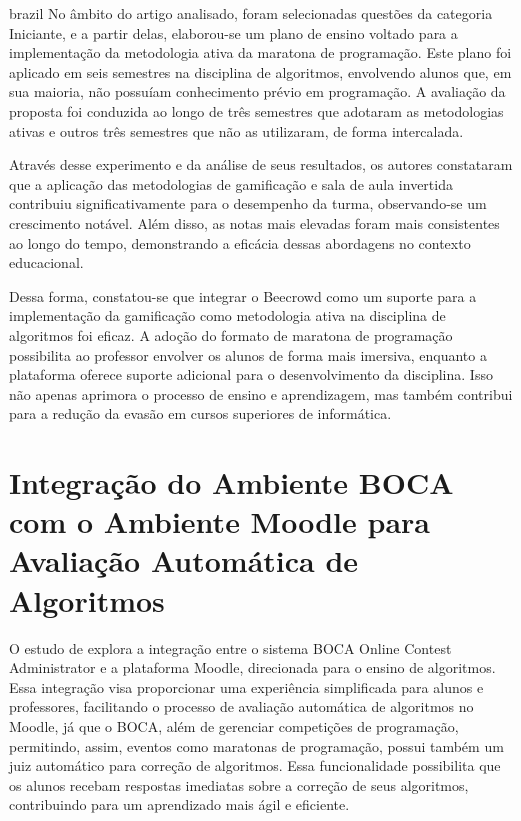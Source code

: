 \begin{otherlanguage*}{brazil}
No âmbito do artigo analisado, foram selecionadas questões da categoria Iniciante, e a partir delas, elaborou-se um plano de ensino voltado para a implementação da metodologia ativa da maratona de programação. Este plano foi aplicado em seis semestres na disciplina de algoritmos, envolvendo alunos que, em sua maioria, não possuíam conhecimento prévio em programação. A avaliação da proposta foi conduzida ao longo de três semestres que adotaram as metodologias ativas e outros três semestres que não as utilizaram, de forma intercalada. 

Através desse experimento e da análise de seus resultados, os autores constataram que a aplicação das metodologias de gamificação e sala de aula invertida contribuiu significativamente para o desempenho da turma, observando-se um crescimento notável. Além disso, as notas mais elevadas foram mais consistentes ao longo do tempo, demonstrando a eficácia dessas abordagens no contexto educacional.

Dessa forma, constatou-se que integrar o Beecrowd como um suporte para a implementação da gamificação como metodologia ativa na disciplina de algoritmos foi eficaz. A adoção do formato de maratona de programação possibilita ao professor envolver os alunos de forma mais imersiva, enquanto a plataforma oferece suporte adicional para o desenvolvimento da disciplina. Isso não apenas aprimora o processo de ensino e aprendizagem, mas também contribui para a redução da evasão em cursos superiores de informática.



\section{Integração do Ambiente BOCA com o Ambiente Moodle para Avaliação Automática de Algoritmos}

O estudo de \textcite{galasso} explora a integração entre o sistema BOCA Online Contest Administrator e a plataforma Moodle, direcionada para o ensino de algoritmos. Essa integração visa proporcionar uma experiência simplificada para alunos e professores, facilitando o processo de avaliação automática de algoritmos no Moodle, já que o BOCA, além de gerenciar competições de programação, permitindo, assim, eventos como maratonas de programação, possui também um juiz automático para correção de algoritmos. Essa funcionalidade possibilita que os alunos recebam respostas imediatas sobre a correção de seus algoritmos, contribuindo para um aprendizado mais ágil e eficiente.


\end{otherlanguage*}
